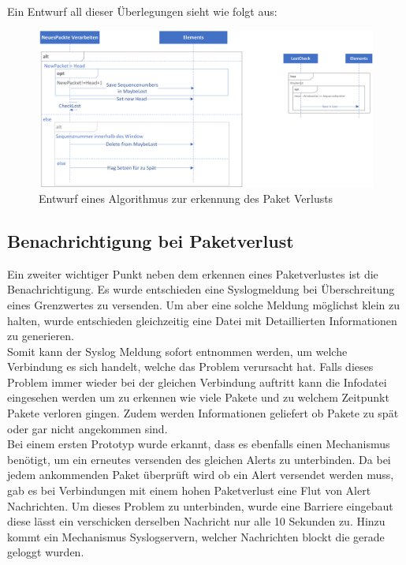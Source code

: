 Ein Entwurf all dieser Überlegungen sieht wie folgt aus:\\
\begin{figure}[H]
    \begin{center}
        \includegraphics[trim=1 0 0 0,clip,width=\textwidth]{start/img/SequenceDiagramLostPackets_2.png}
    \end{center}
    \caption{Entwurf eines Algorithmus zur erkennung des Paket Verlusts}
\end{figure}

\subsection{Benachrichtigung bei Paketverlust}

Ein zweiter wichtiger Punkt neben dem erkennen eines Paketverlustes ist die Benachrichtigung. Es wurde entschieden eine Syslogmeldung bei Überschreitung eines Grenzwertes zu versenden. Um aber eine solche Meldung möglichst klein zu halten, wurde entschieden gleichzeitig eine Datei mit Detaillierten Informationen zu generieren.\\
Somit kann der Syslog Meldung sofort entnommen werden, um welche Verbindung es sich handelt, welche das Problem verursacht hat. Falls dieses Problem immer wieder bei der gleichen Verbindung auftritt kann die Infodatei eingesehen werden um zu erkennen wie viele Pakete und zu welchem Zeitpunkt Pakete verloren gingen. Zudem werden Informationen geliefert ob Pakete zu spät oder gar nicht angekommen sind.\\
Bei einem ersten Prototyp wurde erkannt, dass es ebenfalls einen Mechanismus benötigt, um ein erneutes versenden des gleichen Alerts zu unterbinden. Da bei jedem ankommenden Paket überprüft wird ob ein Alert versendet werden muss, gab es bei Verbindungen mit einem hohen Paketverlust eine Flut von Alert Nachrichten. Um dieses Problem zu unterbinden, wurde eine Barriere eingebaut diese lässt ein verschicken derselben Nachricht nur alle 10 Sekunden zu. Hinzu kommt ein Mechanismus Syslogservern, welcher Nachrichten blockt die gerade geloggt wurden.\\

